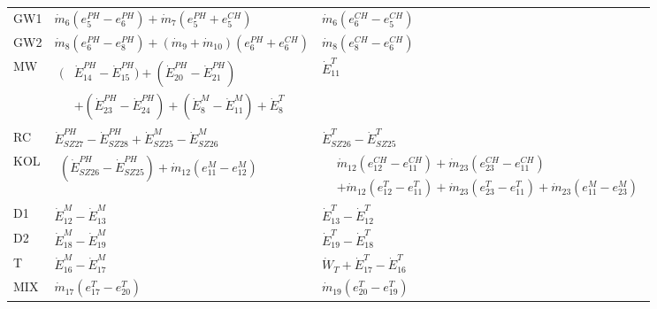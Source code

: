 \begin{landscape}
\begin{table}[p]
\begin{tabular}{lll}
\addlinespace
GW1 & 
$\dot{m}_{6}(e^{PH}_{5} - e^{PH}_{6}) + \dot{m}_{7}(e^{PH}_{5} + e^{CH}_{5})$ & 
$\dot{m}_{6}(e^{CH}_{6} - e^{CH}_{5})$ \\
\addlinespace
GW2 & 
$\dot{m}_{8}(e^{PH}_{6} - e^{PH}_{8}) + (\dot{m}_{9} + \dot{m}_{10})(e^{PH}_{6} + e^{CH}_{6})$ & 
$\dot{m}_{8}(e^{CH}_{8} - e^{CH}_{6})$ \\
\addlinespace
MW &
$\begin{aligned}
(&\dot{E}^{PH}_{14}-\dot{E}^{PH}_{15})
+(\dot{E}^{PH}_{20}-\dot{E}^{PH}_{21}) \\
&+(\dot{E}^{PH}_{23}-\dot{E}^{PH}_{24})
+(\dot{E}^{M}_{8}-\dot{E}^{M}_{11})
+\dot{E}^{T}_{8}
\end{aligned}$ &
$\dot{E}^{T}_{11}$ \\
\addlinespace
RC &
$\dot{E}^{PH}_{SZ27}-\dot{E}^{PH}_{SZ28}+\dot{E}^{M}_{SZ25}-\dot{E}^{M}_{SZ26}$ &
$\dot{E}^{T}_{SZ26}-\dot{E}^{T}_{SZ25}$ \\
\addlinespace
KOL &
$\begin{aligned}(\dot{E}^{PH}_{SZ26}-\dot{E}^{PH}_{SZ25})
+\dot{m}_{12}(e^{M}_{11}-e^{M}_{12})\end{aligned}$ &
$\begin{aligned}
&\dot{m}_{12}(e^{CH}_{12}-e^{CH}_{11})
+\dot{m}_{23}(e^{CH}_{23}-e^{CH}_{11}) \\
&+\dot{m}_{12}(e^{T}_{12}-e^{T}_{11})
+\dot{m}_{23}(e^{T}_{23}-e^{T}_{11})+\dot{m}_{23}(e^{M}_{11}-e^{M}_{23})
\end{aligned}$\\
\addlinespace
D1 &
$\dot{E}^{M}_{12}-\dot{E}^{M}_{13}$ &
$\dot{E}^{T}_{13}-\dot{E}^{T}_{12}$ \\

D2&
$\dot{E}^{M}_{18}-\dot{E}^{M}_{19}$ &
$\dot{E}^{T}_{19}-\dot{E}^{T}_{18}$ \\

T &
$\dot{E}^{M}_{16}-\dot{E}^{M}_{17}$ &
$\dot{W}_{T}+\dot{E}^{T}_{17}-\dot{E}^{T}_{16}$ \\

MIX &
$\dot{m}_{17}\left(e^{T}_{17}-e^{T}_{20}\right)$ &
$\dot{m}_{19}\left(e^{T}_{20}-e^{T}_{19}\right)$ \\
\bottomrule
\end{tabular}
\end{table}
\end{landscape}


